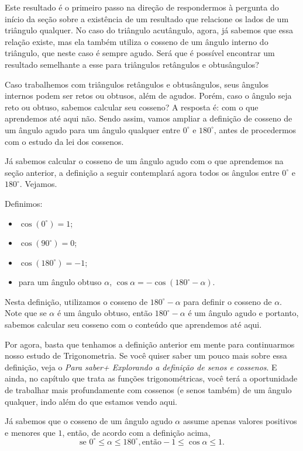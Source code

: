 Este resultado é o primeiro passo na direção de respondermos à pergunta do início da seção sobre a existência de um resultado que relacione os lados de um triângulo qualquer.
%
No caso do triângulo acutângulo, agora, já sabemos que essa relação existe, mas ela também utiliza o cosseno de um ângulo interno do triângulo, que neste caso é sempre agudo.
%
Será que é possível encontrar um resultado semelhante a esse para triângulos retângulos e obtusângulos? 

Caso trabalhemos com triângulos retângulos e obtusângulos, seus ângulos internos podem ser retos ou obtusos, além de agudos. 
%
Porém, caso o ângulo seja reto ou obtuso, sabemos calcular seu cosseno? 
%
A resposta é: com o que aprendemos até aqui não. 
%
Sendo assim, vamos ampliar a definição de cosseno de um ângulo agudo para um ângulo qualquer entre $0^\circ$ e $180^\circ$, antes de procedermos com o estudo da lei dos cossenos. 

Já sabemos calcular o cosseno de um ângulo agudo com o que aprendemos na seção anterior, a definição a seguir contemplará agora todos os ângulos entre $0^\circ$ e $180^\circ$. Vejamos.

Definimos:
\begin{itemize}[topsep=0pt, itemsep=0pt]
\item $\cos(0^\circ)=1$;
\item $\cos(90^\circ)=0$;
\item $\cos(180^\circ)=-1$;
\item para um ângulo obtuso $\alpha$, $\cos\alpha=-\cos(180^\circ-\alpha).$
\end{itemize}

Nesta definição, utilizamos o cosseno de $180^\circ-\alpha$ para definir o cosseno de $\alpha$. Note que se $\alpha$ é um ângulo obtuso, então $180^\circ-\alpha$ é um ângulo agudo e portanto, sabemos calcular seu cosseno com o conteúdo que aprendemos até aqui.

Por agora, basta que tenhamos a definição anterior em mente para continuarmos nosso estudo de Trigonometria. Se você quiser saber um pouco mais sobre essa definição, veja o \textit{Para saber+ Explorando a definição de senos e cossenos}. E ainda, no capítulo que trata as funções trigonométricas, você terá a oportunidade de trabalhar mais profundamente com cossenos (e senos também) de um ângulo qualquer, indo além do que estamos vendo aqui.

\begin{observation}
Já sabemos que o cosseno de um ângulo agudo $\alpha$ assume apenas valores positivos e menores que $1$, então, de acordo com a definição acima,  
$$\text{se }0^\circ \leq\alpha \leq180^\circ, \text{então} -1\leq\cos\alpha\leq 1.$$
\end{observation}

